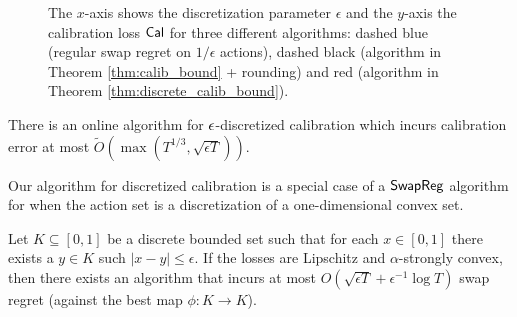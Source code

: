 \documentclass[final,12pt]{alt2025}
\begin{document}
 \begin{figure}[h]
\centering
{}
\caption{The $x$-axis shows the discretization parameter $\epsilon$ and the $y$-axis the calibration loss $\operatorname{\mathsf{Cal}}$ for three different algorithms: dashed blue (regular swap regret on $1/\epsilon$ actions), dashed black (algorithm in Theorem \ref{thm:calib_bound} + rounding) and red (algorithm in Theorem \ref{thm:discrete_calib_bound}).}
\label{fig:discretized_calibration_regret}
 \end{figure}

\begin{theorem}\label{thm:discrete_calib_bound} There is an online algorithm for $\epsilon$-discretized calibration which incurs calibration error at most $\tilde{O}(\max(T^{1/3}, \sqrt{\epsilon T})).$
\end{theorem}

Our algorithm for discretized calibration is a special case of a $\mathsf{SwapReg}$ algorithm for when the action set is a discretization of a one-dimensional convex set.

\begin{theorem}\label{thm:discretized_swap_regret_informal}
Let $K \subseteq [0, 1]$ be a discrete bounded set such that for each $x \in [0, 1]$ there exists a $y \in K$ such $|x-y| \leq \epsilon$. If the losses are Lipschitz and $\alpha$-strongly convex, then there exists an algorithm that incurs at most $O(\sqrt{\epsilon T} + \epsilon^{-1} \log T)$ swap regret (against the best map $\phi: K \rightarrow K$).
\end{theorem}
\end{document}
